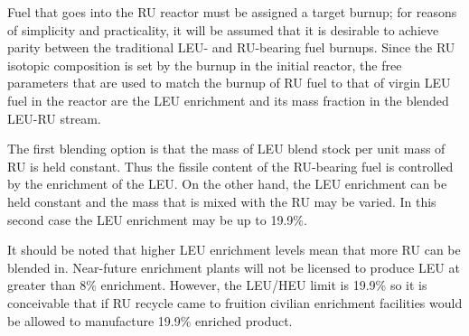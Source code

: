 Fuel that goes into the RU reactor must be assigned a target burnup; for reasons of simplicity and 
practicality, it will be assumed that it is desirable to achieve parity between the traditional LEU- and 
RU-bearing fuel burnups.  Since the RU isotopic composition is set by the burnup in the initial reactor, 
the free parameters that are used to match the burnup of RU fuel to that of virgin LEU fuel in the reactor 
are the LEU enrichment and its mass fraction in the blended LEU-RU stream.    

The first blending option is that the mass of LEU blend stock per unit mass of RU is held constant.  
Thus the fissile content of the RU-bearing fuel is controlled by the enrichment of the LEU.  On the 
other hand, the LEU enrichment can be held constant and the mass that is mixed with the RU may be 
varied.  In this second case the LEU enrichment may be up to 19.9\%.  

It should be noted that higher LEU enrichment levels mean that more RU can be blended in.
Near-future enrichment plants will not be licensed to produce LEU at 
greater than 8\%  enrichment. However, the LEU/HEU limit is 19.9\% so it is conceivable 
that if RU recycle came to fruition civilian enrichment facilities would be allowed to manufacture 19.9\% 
enriched product.  



